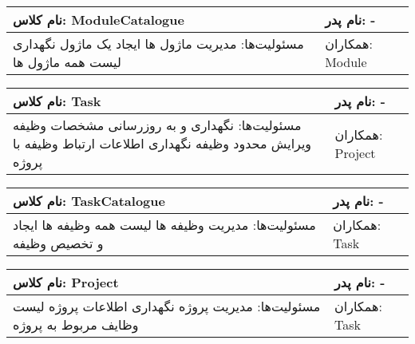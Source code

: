\begin{tabular}{|p{6cm}|p{6cm}|}
\hline
نام کلاس: ModuleCatalogue
&
نام پدر: -
\\
\hline
مسئولیت‌ها:
\newline
مدیریت ماژول ها
\newline
ایجاد یک ماژول
\newline
نگهداری لیست همه ماژول ها
&
همکاران:
\newline
Module
\\
\hline
\end{tabular}
\vspace{1cm}


\begin{tabular}{|p{6cm}|p{6cm}|}
\hline
نام کلاس: Task
&
نام پدر: -
\\
\hline
مسئولیت‌ها:
\newline
نگهداری و به روزرسانی مشخصات وظیفه
\newline
ویرایش محدود وظیفه
\newline
نگهداری اطلاعات ارتباط وظیفه با پروژه
&
همکاران:
\newline
Project
\\
\hline
\end{tabular}
\vspace{1cm}

\begin{tabular}{|p{6cm}|p{6cm}|}
\hline
نام کلاس: TaskCatalogue
&
نام پدر: -
\\
\hline
مسئولیت‌ها:
\newline
مدیریت وظیفه ها
\newline
لیست همه وظیفه ها
\newline
ایجاد و تخصیص وظیفه

&
همکاران:
\newline
Task
\\
\hline
\end{tabular}
\vspace{1cm}

\begin{tabular}{|p{6cm}|p{6cm}|}
\hline
نام کلاس: Project
&
نام پدر: -
\\
\hline
مسئولیت‌ها:
\newline
مدیریت پروژه
\newline
نگهداری اطلاعات پروژه
\newline
لیست وظایف مربوط به پروژه

&
همکاران:
\newline
 Task
\\
\hline
\end{tabular}
\vspace{1cm}


